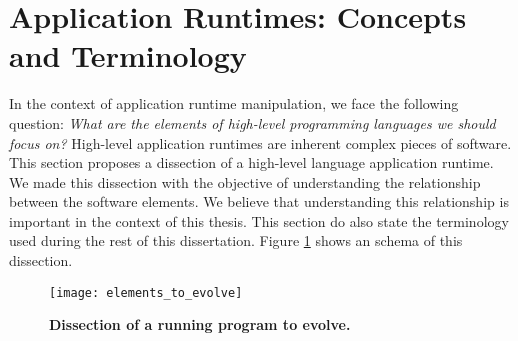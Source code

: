 


\section{Application Runtimes: Concepts and Terminology}

In the context of application runtime manipulation, we face the following question: \emph{What are the elements of high-level programming languages we should focus on?} High-level application runtimes are inherent complex pieces of software. 
This section proposes a dissection of a high-level language application runtime. We made this dissection with the objective of understanding the relationship between the software elements. We believe that understanding this relationship is important in the context of this thesis. This section do also state the terminology used during the rest of this dissertation. Figure \ref{fig:whatToEvolve} shows an schema of this dissection.

\begin{figure}[!ht]
\begin{center}
\texttt{[image: elements\_to\_evolve]}
\caption{\textbf{Dissection of a running program to evolve.}\label{fig:whatToEvolve} }
\end{center}
\end{figure}

